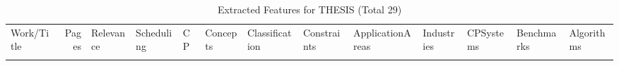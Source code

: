 {\scriptsize
\begin{longtable}{>{\raggedright\arraybackslash}p{3cm}r>{\raggedright\arraybackslash}p{1.0cm}>{\raggedright\arraybackslash}p{ 1.50cm}>{\raggedright\arraybackslash}p{ 1.50cm}>{\raggedright\arraybackslash}p{ 1.50cm}>{\raggedright\arraybackslash}p{ 1.50cm}>{\raggedright\arraybackslash}p{ 1.50cm}>{\raggedright\arraybackslash}p{ 1.50cm}>{\raggedright\arraybackslash}p{ 1.50cm}>{\raggedright\arraybackslash}p{ 1.50cm}>{\raggedright\arraybackslash}p{ 1.50cm}>{\raggedright\arraybackslash}p{ 1.50cm}}
\rowcolor{white}\caption{Extracted Features for THESIS (Total 29)}\\ \toprule
\rowcolor{white}Work/Title & Pages & Relevance & Scheduling& CP& Concepts& Classification& Constraints& ApplicationAreas& Industries& CPSystems& Benchmarks& Algorithms\\ \midrule\endhead
\bottomrule
\endfoot

\end{longtable}}
